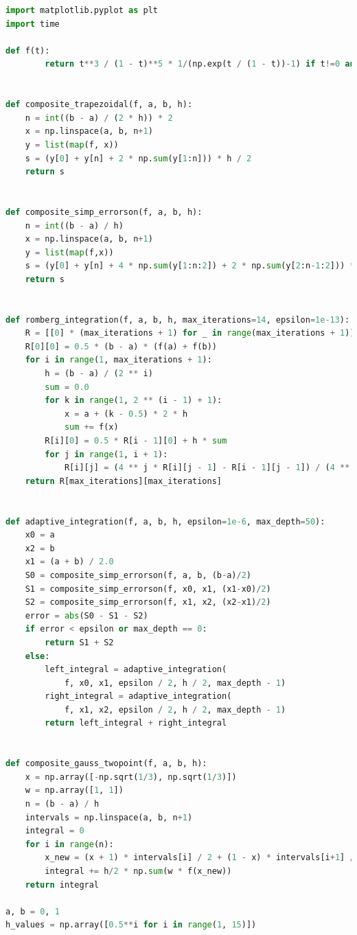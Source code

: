 \documentclass[a4paper,11pt,notitlepage]{article}
\begin{document}
\begin{lstlisting}[language=Python,caption={Fifth Chapter 2.py},label={code2.1}]
import matplotlib.pyplot as plt
import time

def f(t):
        return t**3 / (1 - t)**5 * 1/(np.exp(t / (1 - t))-1) if t!=0 and t!=1 else 0


def composite_trapezoidal(f, a, b, h):
    n = int((b - a) / (2 * h)) * 2
    x = np.linspace(a, b, n+1)
    y = list(map(f, x))
    s = (y[0] + y[n] + 2 * np.sum(y[1:n])) * h / 2
    return s


def composite_simp_errorson(f, a, b, h):
    n = int((b - a) / h)
    x = np.linspace(a, b, n+1)
    y = list(map(f,x))
    s = (y[0] + y[n] + 4 * np.sum(y[1:n:2]) + 2 * np.sum(y[2:n-1:2])) * h / 3
    return s


def romberg_integration(f, a, b, h, max_iterations=14, epsilon=1e-13):
    R = [[0] * (max_iterations + 1) for _ in range(max_iterations + 1)]
    R[0][0] = 0.5 * (b - a) * (f(a) + f(b))
    for i in range(1, max_iterations + 1):
        h = (b - a) / (2 ** i)
        sum = 0.0
        for k in range(1, 2 ** (i - 1) + 1):
            x = a + (k - 0.5) * 2 * h
            sum += f(x)
        R[i][0] = 0.5 * R[i - 1][0] + h * sum
        for j in range(1, i + 1):
            R[i][j] = (4 ** j * R[i][j - 1] - R[i - 1][j - 1]) / (4 ** j - 1)
    return R[max_iterations][max_iterations]


def adaptive_integration(f, a, b, h, epsilon=1e-6, max_depth=50):
    x0 = a
    x2 = b
    x1 = (a + b) / 2.0
    S0 = composite_simp_errorson(f, a, b, (b-a)/2)
    S1 = composite_simp_errorson(f, x0, x1, (x1-x0)/2)
    S2 = composite_simp_errorson(f, x1, x2, (x2-x1)/2)
    error = abs(S0 - S1 - S2)
    if error < epsilon or max_depth == 0:
        return S1 + S2
    else:
        left_integral = adaptive_integration(
            f, x0, x1, epsilon / 2, h / 2, max_depth - 1)
        right_integral = adaptive_integration(
            f, x1, x2, epsilon / 2, h / 2, max_depth - 1)
        return left_integral + right_integral


def composite_gauss_twopoint(f, a, b, h):
    x = np.array([-np.sqrt(1/3), np.sqrt(1/3)])
    w = np.array([1, 1])
    n = (b - a) / h
    intervals = np.linspace(a, b, n+1)
    integral = 0
    for i in range(n):
        x_new = (x + 1) * intervals[i] / 2 + (1 - x) * intervals[i+1] / 2
        integral += h/2 * np.sum(w * f(x_new))
    return integral

a, b = 0, 1
h_values = np.array([0.5**i for i in range(1, 15)])


\end{lstlisting}
\end{document}
